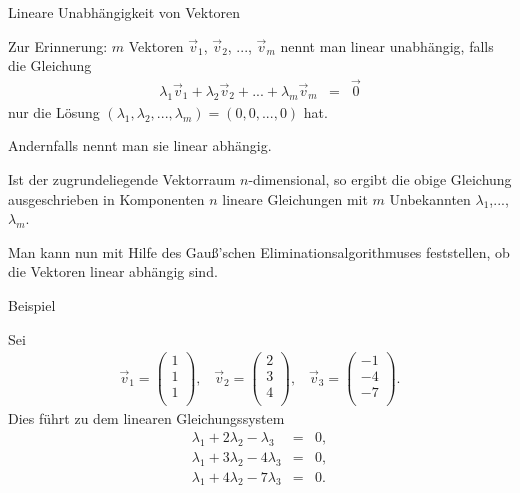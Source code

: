 \documentclass[german]{beamer}
\newcommand{\bq}{\begin{eqnarray*}}
\newcommand{\eq}{\end{eqnarray*}}
\begin{document}
\begin{frame}{Lineare Unabh\"angigkeit von Vektoren}

Zur Erinnerung: $m$ Vektoren $\vec{v}_1$, $\vec{v}_2$, ..., $\vec{v}_m$ nennt man linear unabh\"angig,
falls die Gleichung
\bq
 \lambda_1 \vec{v}_1 + \lambda_2 \vec{v}_2 + ... + \lambda_m \vec{v}_m & = & \vec{0}
\eq
nur die L\"osung $(\lambda_1,\lambda_2,...,\lambda_m)=(0,0,...,0)$ hat. 

Andernfalls nennt man sie linear abh\"angig.

Ist der zugrundeliegende Vektorraum $n$-dimensional, so ergibt die obige Gleichung ausgeschrieben
in Komponenten $n$ lineare Gleichungen mit $m$ Unbekannten $\lambda_1$,..., $\lambda_m$.

Man kann nun mit Hilfe des Gau{\ss}'schen Eliminationsalgorithmuses feststellen, ob die Vektoren
linear abh\"angig sind.

\end{frame}

\begin{frame}{Beispiel}

Sei
\bq
 \vec{v}_1 = \left( \begin{array}{r} 1 \\ 1 \\ 1 \\ \end{array} \right),
 \;\;\;
 \vec{v}_2 = \left( \begin{array}{r} 2 \\ 3 \\ 4 \\ \end{array} \right),
 \;\;\;
 \vec{v}_3 = \left( \begin{array}{r} -1 \\ -4 \\ -7 \\ \end{array} \right).
\eq
Dies f\"uhrt zu dem linearen Gleichungssystem
\bq
 \lambda_1 + 2 \lambda_2 - \lambda_3 & = & 0,
 \nonumber \\
 \lambda_1 + 3 \lambda_2 - 4 \lambda_3 & = & 0,
 \nonumber \\
 \lambda_1 + 4 \lambda_2 - 7 \lambda_3 & = & 0.
\eq

\end{frame}
\end{document}
